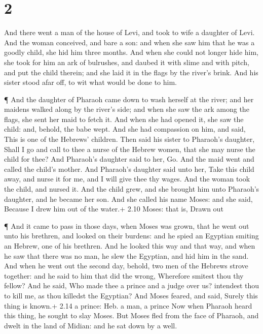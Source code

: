 \hypertarget{section-1}{%
\section{2}\label{section-1}}

 And there went a man of the house of Levi, and took to wife
a daughter of Levi.  And the woman conceived, and bare a
son: and when she saw him that he was a goodly child, she hid him three
months.  And when she could not longer hide him, she took
for him an ark of bulrushes, and daubed it with slime and with pitch,
and put the child therein; and she laid it in the flags by the river's
brink.  And his sister stood afar off, to wit what would be
done to him.

 ¶ And the daughter of Pharaoh came down to wash herself at
the river; and her maidens walked along by the river's side; and when
she saw the ark among the flags, she sent her maid to fetch it.
 And when she had opened it, she saw the child: and, behold,
the babe wept. And she had compassion on him, and said, This is one of
the Hebrews' children.  Then said his sister to Pharaoh's
daughter, Shall I go and call to thee a nurse of the Hebrew women, that
she may nurse the child for thee?  And Pharaoh's daughter
said to her, Go. And the maid went and called the child's mother.
 And Pharaoh's daughter said unto her, Take this child away,
and nurse it for me, and I will give thee thy wages. And the woman took
the child, and nursed it.  And the child grew, and she
brought him unto Pharaoh's daughter, and he became her son. And she
called his name Moses: and she said, Because I drew him out of the
water.+ 2.10 Moses: that is, Drawn out

 ¶ And it came to pass in those days, when Moses was grown,
that he went out unto his brethren, and looked on their burdens: and he
spied an Egyptian smiting an Hebrew, one of his brethren. 
And he looked this way and that way, and when he saw that there was no
man, he slew the Egyptian, and hid him in the sand.  And
when he went out the second day, behold, two men of the Hebrews strove
together: and he said to him that did the wrong, Wherefore smitest thou
thy fellow?  And he said, Who made thee a prince and a
judge over us? intendest thou to kill me, as thou killedst the Egyptian?
And Moses feared, and said, Surely this thing is known.+ 2.14 a prince:
Heb. a man, a prince  Now when Pharaoh heard this thing, he
sought to slay Moses. But Moses fled from the face of Pharaoh, and dwelt
in the land of Midian: and he sat down by a well.

